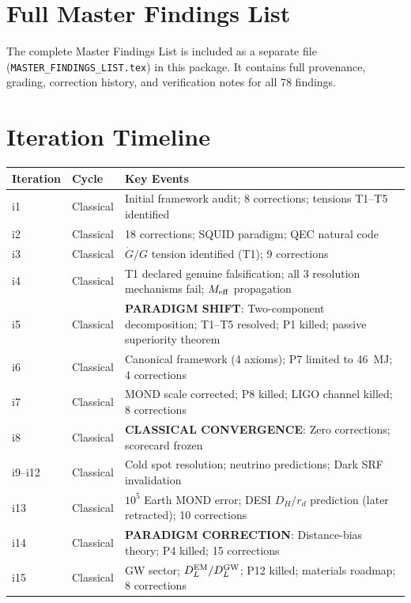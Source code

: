 \documentclass[11pt,a4paper]{article}
\begin{document}
\section{Full Master Findings List}\label{app:findings}

The complete Master Findings List is included as a separate file (\texttt{MASTER\_FINDINGS\_LIST.tex}) in this package. It contains full provenance, grading, correction history, and verification notes for all 78 findings.

\section{Iteration Timeline}\label{app:timeline}

\begin{center}
\begin{tabular}{llp{8cm}}
\toprule
\textbf{Iteration} & \textbf{Cycle} & \textbf{Key Events} \\
\midrule
i1 & Classical & Initial framework audit; 8 corrections; tensions T1--T5 identified \\
i2 & Classical & 18 corrections; SQUID paradigm; QEC natural code \\
i3 & Classical & $\dot{G}/G$ tension identified (T1); 9 corrections \\
i4 & Classical & T1 declared genuine falsification; all 3 resolution mechanisms fail; $M_{\rm eff}$ propagation \\
i5 & Classical & \textbf{PARADIGM SHIFT}: Two-component decomposition; T1--T5 resolved; P1 killed; passive superiority theorem \\
i6 & Classical & Canonical framework (4 axioms); P7 limited to 46~MJ; 4 corrections \\
i7 & Classical & MOND scale corrected; P8 killed; LIGO channel killed; 8 corrections \\
i8 & Classical & \textbf{CLASSICAL CONVERGENCE}: Zero corrections; scorecard frozen \\
i9--i12 & Classical & Cold spot resolution; neutrino predictions; Dark SRF invalidation \\
i13 & Classical & $10^5$ Earth MOND error; DESI $D_H/r_d$ prediction (later retracted); 10 corrections \\
i14 & Classical & \textbf{PARADIGM CORRECTION}: Distance-bias theory; P4 killed; 15 corrections \\
i15 & Classical & GW sector; $D_L^{\rm EM}/D_L^{\rm GW}$; P12 killed; materials roadmap; 8 corrections \\

\end{tabular}
\end{center}
\end{document}
